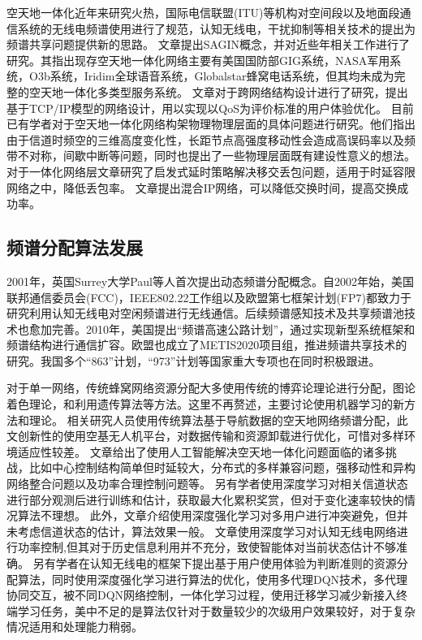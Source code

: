 空天地一体化近年来研究火热，国际电信联盟(ITU)等机构对空间段以及地面段通信系统的无线电频谱使用进行了规范，认知无线电，干扰抑制等相关技术的提出为频谱共享问题提供新的思路。
文章\cite{8368236}提出SAGIN概念，并对近些年相关工作进行了研究。其指出现存空天地一体化网络主要有美国国防部GIG系统，NASA军用系统，O3b系统，Iridim全球语音系统，Globalstar蜂窝电话系统，但其均未成为完整的空天地一体化多类型服务系统。
文章\cite{6587995}对于跨网络结构设计进行了研究，提出基于TCP/IP模型的网络设计，用以实现以QoS为评价标准的用户体验优化。
目前已有学者对于空天地一体化网络构架物理物理层面的具体问题进行研究\cite{7879675}。他们指出由于信道时频空的三维高度变化性，长距节点高强度移动性会造成高误码率以及频带不对称，间歇中断等问题，同时也提出了一些物理层面既有建设性意义的想法。
对于一体化网络层文章\cite{8116396}研究了启发式延时策略解决移交丢包问题，适用于时延容限网络之中，降低丢包率。
文章\cite{7925019}提出混合IP网络，可以降低交换时间，提高交换成功率。


\subsection{频谱分配算法发展}

2001年，英国Surrey大学Paul等人首次提出动态频谱分配概念。自2002年始，美国联邦通信委员会(FCC)，IEEE802.22工作组以及欧盟第七框架计划(FP7)都致力于研究利用认知无线电对空闲频谱进行无线通信。后续频谱感知技术及共享频谱池技术也愈加完善。2010年，美国提出“频谱高速公路计划”，通过实现新型系统框架和频谱结构进行通信扩容。欧盟也成立了METIS2020项目组，推进频谱共享技术的研究。我国多个“863”计划，“973”计划等国家重大专项也在同时积极跟进。

对于单一网络，传统蜂窝网络资源分配大多使用传统的博弈论理论\cite{6998030}进行分配，图论着色理论\cite{7833211}，和利用遗传算法\cite{8336853}等方法。这里不再赘述，主要讨论使用机器学习的新方法和理论。
相关研究人员\cite{7127619}使用传统算法基于导航数据的空天地网络频谱分配，此文创新性的使用空基无人机平台，对数据传输和资源卸载进行优化，可惜对多样环境适应性较差。
文章\cite{8612450}给出了使用人工智能解决空天地一体化问题面临的诸多挑战，比如中心控制结构简单但时延较大，分布式的多样兼容问题，强移动性和异构网络整合问题以及功率合理控制问题等。
另有学者使用深度学习对相关信道状态进行部分观测后进行训练和估计\cite{8303773}，获取最大化累积奖赏，但对于变化速率较快的情况算法不理想。
此外，文章\cite{8254101}介绍使用深度强化学习对多用户进行冲突避免，但并未考虑信道状态的估计，算法效果一般。
文章\cite{Li2018Intelligent}使用深度学习对认知无线电网络进行功率控制,但其对于历史信息利用并不充分，致使智能体对当前状态估计不够准确。
另有学者\cite{8403658}在认知无线电的框架下提出基于用户使用体验为判断准则的资源分配算法，同时使用深度强化学习进行算法的优化，使用多代理DQN技术，多代理协同交互，被不同DQN网络控制，一体化学习过程，使用迁移学习减少新接入终端学习任务，美中不足的是算法仅针对于数量较少的次级用户效果较好，对于复杂情况适用和处理能力稍弱。


